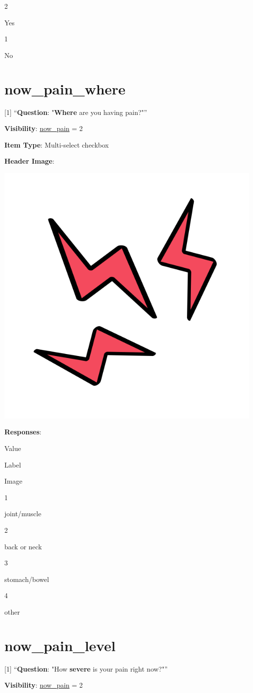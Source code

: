 \documentclass[]{book}
\begin{document}
2

Yes

1

No

\hypertarget{now_pain_where}{%
\section{now\_pain\_where}\label{now_pain_where}}

{[}1{]} ``\textbf{Question}: "\textbf{Where} are you having pain?"''

\textbf{Visibility}: \protect\hyperlink{now_pain}{now\_pain} = 2

\textbf{Item Type}: Multi-select checkbox

\textbf{Header Image}:

\begin{flushleft}\includegraphics[width=0.33\linewidth]{downloadFigs4latex_NIMH_Applet_Codebook/now_pain_where_headerImg} \end{flushleft}

\textbf{Responses}:

Value

Label

Image

1

joint/muscle

2

back or neck

3

stomach/bowel

4

other

\hypertarget{now_pain_level}{%
\section{now\_pain\_level}\label{now_pain_level}}

{[}1{]} ``\textbf{Question}: "How \textbf{severe} is your pain right now?"''

\textbf{Visibility}: \protect\hyperlink{now_pain}{now\_pain} = 2
\end{document}
